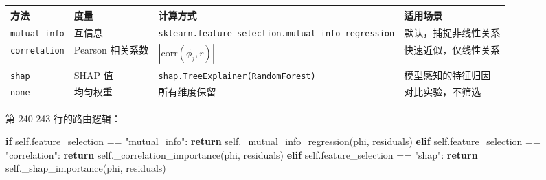 \documentclass[
  12pt,
]{ctexart}
\newenvironment{Shaded}{}{}
\newcommand{\ControlFlowTok}[1]{\textcolor[rgb]{0.00,0.44,0.13}{\textbf{#1}}}
\newcommand{\NormalTok}[1]{#1}
\newcommand{\OperatorTok}[1]{\textcolor[rgb]{0.40,0.40,0.40}{#1}}
\newcommand{\StringTok}[1]{\textcolor[rgb]{0.25,0.44,0.63}{#1}}
\newcommand{\VariableTok}[1]{\textcolor[rgb]{0.10,0.09,0.49}{#1}}
\begin{document}
\begin{longtable}[]{@{}
  >{\raggedright\arraybackslash}p{}
  >{\raggedright\arraybackslash}p{}
  >{\raggedright\arraybackslash}p{}
  >{\raggedright\arraybackslash}p{}@{}}
\toprule\noalign{}
\begin{minipage}[b]{\linewidth}\raggedright
方法
\end{minipage} & \begin{minipage}[b]{\linewidth}\raggedright
度量
\end{minipage} & \begin{minipage}[b]{\linewidth}\raggedright
计算方式
\end{minipage} & \begin{minipage}[b]{\linewidth}\raggedright
适用场景
\end{minipage} \\
\midrule\noalign{}
\endhead
\bottomrule\noalign{}
\endlastfoot
\texttt{mutual\_info} & 互信息 &
\texttt{sklearn.feature\_selection.mutual\_info\_regression} &
默认，捕捉非线性关系 \\
\texttt{correlation} & Pearson 相关系数 & \(|\text{corr}(\phi_j, r)|\) &
快速近似，仅线性关系 \\
\texttt{shap} & SHAP 值 & \texttt{shap.TreeExplainer(RandomForest)} &
模型感知的特征归因 \\
\texttt{none} & 均匀权重 & 所有维度保留 & 对比实验，不筛选 \\
\end{longtable}

第 240-243 行的路由逻辑：

\begin{Shaded}
\begin{Highlighting}[]
\ControlFlowTok{if} \VariableTok{self}\NormalTok{.feature\_selection }\OperatorTok{==} \StringTok{"mutual\_info"}\NormalTok{:}
    \ControlFlowTok{return} \VariableTok{self}\NormalTok{.\_mutual\_info\_regression(phi, residuals)}
\ControlFlowTok{elif} \VariableTok{self}\NormalTok{.feature\_selection }\OperatorTok{==} \StringTok{"correlation"}\NormalTok{:}
    \ControlFlowTok{return} \VariableTok{self}\NormalTok{.\_correlation\_importance(phi, residuals)}
\ControlFlowTok{elif} \VariableTok{self}\NormalTok{.feature\_selection }\OperatorTok{==} \StringTok{"shap"}\NormalTok{:}
    \ControlFlowTok{return} \VariableTok{self}\NormalTok{.\_shap\_importance(phi, residuals)}
\end{Highlighting}
\end{Shaded}
\end{document}
